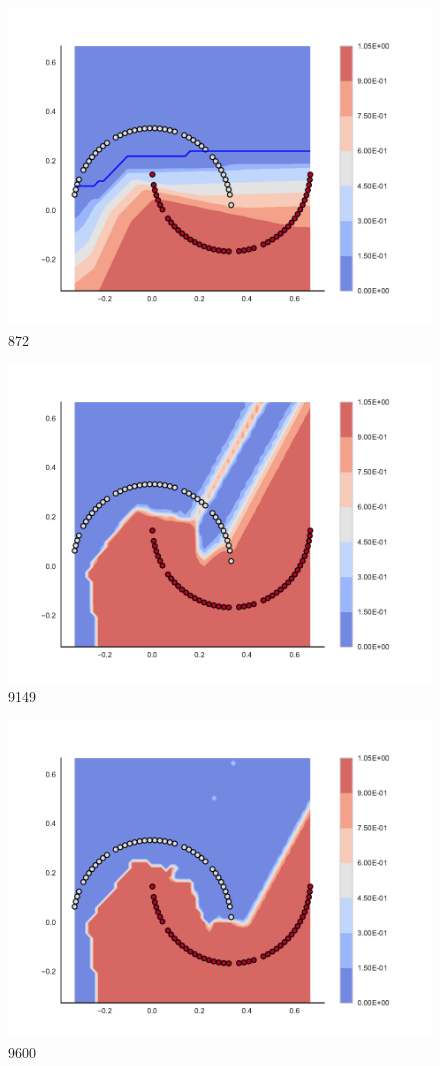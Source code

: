 \begin{subfigure}[b]{0.09\textwidth}
    \includegraphics[width=\textwidth]{img/convergence/872.pdf}
    \caption{872}
    \label{fig:convergence_872}
\end{subfigure}
%
\begin{subfigure}[b]{0.09\textwidth}
    \includegraphics[width=\textwidth]{img/convergence/9149.pdf}
    \caption{9149}
    \label{fig:convergence_9149}
\end{subfigure}
%
\begin{subfigure}[b]{0.09\textwidth}
    \includegraphics[width=\textwidth]{img/convergence/9600.pdf}
    \caption{9600}
    \label{fig:convergence_9600}
\end{subfigure}
%
